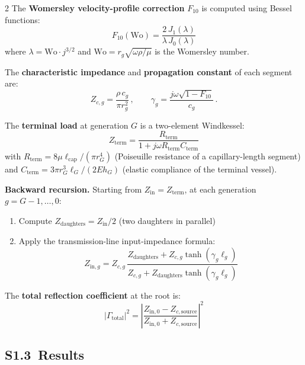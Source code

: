 \documentclass[11pt,a4paper]{article}
\begin{document}
\begin{multicols}{2}
The \textbf{Womersley velocity-profile correction} $F_{10}$ is computed using
Bessel functions:
\begin{equation}
F_{10}(\mathrm{Wo}) = \frac{2\,J_1(\lambda)}{\lambda\,J_0(\lambda)}
\end{equation}
where $\lambda = \mathrm{Wo} \cdot j^{3/2}$ and $\mathrm{Wo} =
r_g\sqrt{\omega\rho/\mu}$ is the Womersley number.

The \textbf{characteristic impedance} and \textbf{propagation constant} of each
segment are:
\begin{equation}
Z_{c,g} = \frac{\rho\,c_g}{\pi r_g^2}\,, \qquad \gamma_g = \frac{j\omega\sqrt{1-F_{10}}}{c_g}\,.
\end{equation}

The \textbf{terminal load} at generation $G$ is a two-element Windkessel:
\begin{equation}
Z_{\mathrm{term}} = \frac{R_{\mathrm{term}}}{1 + j\omega R_{\mathrm{term}} C_{\mathrm{term}}}
\end{equation}
with $R_{\mathrm{term}} = 8\mu\ell_{\mathrm{cap}}/(\pi r_G^4)$ (Poiseuille
resistance of a capillary-length segment) and $C_{\mathrm{term}} = 3\pi r_G^3
\ell_G/(2Eh_G)$ (elastic compliance of the terminal vessel).

\textbf{Backward recursion.} Starting from $Z_{\mathrm{in}} = Z_{\mathrm{term}}$, at each generation $g = G-1, \ldots, 0$:
\begin{enumerate}
\item Compute $Z_{\mathrm{daughters}} = Z_{\mathrm{in}}/2$ (two daughters in parallel)
\item Apply the transmission-line input-impedance formula:
\begin{equation}
Z_{\mathrm{in},g} = Z_{c,g}\,\frac{Z_{\mathrm{daughters}} + Z_{c,g}\tanh(\gamma_g\ell_g)}{Z_{c,g} + Z_{\mathrm{daughters}}\tanh(\gamma_g\ell_g)}
\end{equation}
\end{enumerate}

The \textbf{total reflection coefficient} at the root is:
\begin{equation}
|\Gamma_{\mathrm{total}}|^2 = \left|\frac{Z_{\mathrm{in},0} - Z_{c,\mathrm{source}}}{Z_{\mathrm{in},0} + Z_{c,\mathrm{source}}}\right|^2
\end{equation}

\subsection*{S1.3\ Results}


\end{multicols}
\end{document}
